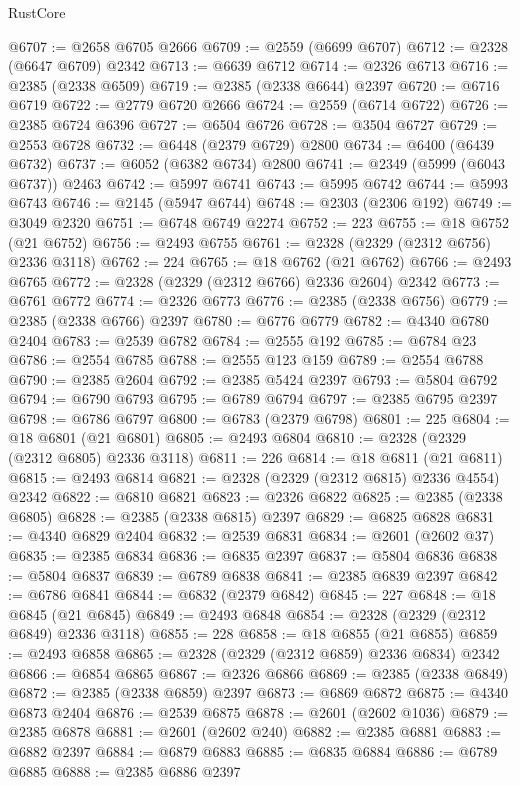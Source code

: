 \begin{lexlean}{RustCore}
\begin{coremodule}
@6707 := @2658 @6705 @2666
@6709 := @2559 (@6699 @6707)
@6712 := @2328 (@6647 @6709) @2342
@6713 := @6639 @6712
@6714 := @2326 @6713
@6716 := @2385 (@2338 @6509)
@6719 := @2385 (@2338 @6644) @2397
@6720 := @6716 @6719
@6722 := @2779 @6720 @2666
@6724 := @2559 (@6714 @6722)
@6726 := @2385 @6724 @6396
@6727 := @6504 @6726
@6728 := @3504 @6727
@6729 := @2553 @6728
@6732 := @6448 (@2379 @6729) @2800
@6734 := @6400 (@6439 @6732)
@6737 := @6052 (@6382 @6734) @2800
@6741 := @2349 (@5999 (@6043 @6737)) @2463
@6742 := @5997 @6741
@6743 := @5995 @6742
@6744 := @5993 @6743
@6746 := @2145 (@5947 @6744)
@6748 := @2303 (@2306 @192)
@6749 := @3049 @2320
@6751 := @6748 @6749 @2274
@6752 := 223
@6755 := @18 @6752 (@21 @6752)
@6756 := @2493 @6755
@6761 := @2328 (@2329 (@2312 @6756) @2336 @3118)
@6762 := 224
@6765 := @18 @6762 (@21 @6762)
@6766 := @2493 @6765
@6772 := @2328 (@2329 (@2312 @6766) @2336 @2604) @2342
@6773 := @6761 @6772
@6774 := @2326 @6773
@6776 := @2385 (@2338 @6756)
@6779 := @2385 (@2338 @6766) @2397
@6780 := @6776 @6779
@6782 := @4340 @6780 @2404
@6783 := @2539 @6782
@6784 := @2555 @192
@6785 := @6784 @23
@6786 := @2554 @6785
@6788 := @2555 @123 @159
@6789 := @2554 @6788
@6790 := @2385 @2604
@6792 := @2385 @5424 @2397
@6793 := @5804 @6792
@6794 := @6790 @6793
@6795 := @6789 @6794
@6797 := @2385 @6795 @2397
@6798 := @6786 @6797
@6800 := @6783 (@2379 @6798)
@6801 := 225
@6804 := @18 @6801 (@21 @6801)
@6805 := @2493 @6804
@6810 := @2328 (@2329 (@2312 @6805) @2336 @3118)
@6811 := 226
@6814 := @18 @6811 (@21 @6811)
@6815 := @2493 @6814
@6821 := @2328 (@2329 (@2312 @6815) @2336 @4554) @2342
@6822 := @6810 @6821
@6823 := @2326 @6822
@6825 := @2385 (@2338 @6805)
@6828 := @2385 (@2338 @6815) @2397
@6829 := @6825 @6828
@6831 := @4340 @6829 @2404
@6832 := @2539 @6831
@6834 := @2601 (@2602 @37)
@6835 := @2385 @6834
@6836 := @6835 @2397
@6837 := @5804 @6836
@6838 := @5804 @6837
@6839 := @6789 @6838
@6841 := @2385 @6839 @2397
@6842 := @6786 @6841
@6844 := @6832 (@2379 @6842)
@6845 := 227
@6848 := @18 @6845 (@21 @6845)
@6849 := @2493 @6848
@6854 := @2328 (@2329 (@2312 @6849) @2336 @3118)
@6855 := 228
@6858 := @18 @6855 (@21 @6855)
@6859 := @2493 @6858
@6865 := @2328 (@2329 (@2312 @6859) @2336 @6834) @2342
@6866 := @6854 @6865
@6867 := @2326 @6866
@6869 := @2385 (@2338 @6849)
@6872 := @2385 (@2338 @6859) @2397
@6873 := @6869 @6872
@6875 := @4340 @6873 @2404
@6876 := @2539 @6875
@6878 := @2601 (@2602 @1036)
@6879 := @2385 @6878
@6881 := @2601 (@2602 @240)
@6882 := @2385 @6881
@6883 := @6882 @2397
@6884 := @6879 @6883
@6885 := @6835 @6884
@6886 := @6789 @6885
@6888 := @2385 @6886 @2397

\end{coremodule}
\end{lexlean}
